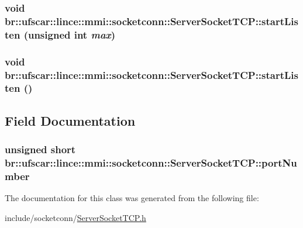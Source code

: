 \hypertarget{classbr_1_1ufscar_1_1lince_1_1mmi_1_1socketconn_1_1ServerSocketTCP_a04a980f7cc35bd2c962db3959af74cbe}{
\subsubsection[{startListen}]{\setlength{\rightskip}{0pt plus 5cm}void br::ufscar::lince::mmi::socketconn::ServerSocketTCP::startListen (unsigned int {\em max})}}
\label{classbr_1_1ufscar_1_1lince_1_1mmi_1_1socketconn_1_1ServerSocketTCP_a04a980f7cc35bd2c962db3959af74cbe}
\hypertarget{classbr_1_1ufscar_1_1lince_1_1mmi_1_1socketconn_1_1ServerSocketTCP_a62f72f6e9e59f52bb2166dfe24b96404}{
\subsubsection[{startListen}]{\setlength{\rightskip}{0pt plus 5cm}void br::ufscar::lince::mmi::socketconn::ServerSocketTCP::startListen ()}}
\label{classbr_1_1ufscar_1_1lince_1_1mmi_1_1socketconn_1_1ServerSocketTCP_a62f72f6e9e59f52bb2166dfe24b96404}


\subsection{Field Documentation}
\hypertarget{classbr_1_1ufscar_1_1lince_1_1mmi_1_1socketconn_1_1ServerSocketTCP_ac8243d57e2882ed374c0b5c27109ec5e}{
\subsubsection[{portNumber}]{\setlength{\rightskip}{0pt plus 5cm}unsigned short {\bf br::ufscar::lince::mmi::socketconn::ServerSocketTCP::portNumber}}}
\label{classbr_1_1ufscar_1_1lince_1_1mmi_1_1socketconn_1_1ServerSocketTCP_ac8243d57e2882ed374c0b5c27109ec5e}


The documentation for this class was generated from the following file:\begin{DoxyCompactItemize}
\item 
include/socketconn/\hyperlink{ServerSocketTCP_8h}{ServerSocketTCP.h}\end{DoxyCompactItemize}
